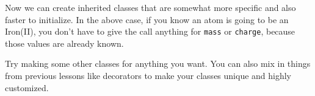     Now we can create inherited classes that are somewhat more specific and
also faster to initialize. In the above case, if you know an atom is
going to be an Iron(II), you don't have to give the call anything for
\texttt{mass} or \texttt{charge}, because those values are already
known.

Try making some other classes for anything you want. You can also mix in
things from previous lessons like decorators to make your classes unique
and highly customized.
